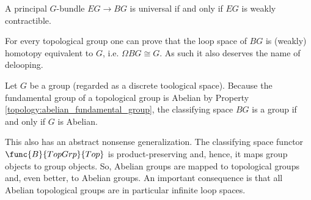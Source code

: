     \begin{property}
        A principal $G$-bundle $EG\rightarrow BG$ is universal if and only if $EG$ is weakly contractible.
    \end{property}
    \begin{property}[Delooping]\label{bundle:delooping}
        For every topological group one can prove that the loop space of $BG$ is (weakly) homotopy equivalent to $G$, i.e. $\Omega BG\cong G$. As such it also deserves the name of delooping.
    \end{property}
    \begin{property}[Groups]
        Let $G$ be a group (regarded as a discrete toological space). Because the fundamental group of a topological group is Abelian by Property \ref{topology:abelian_fundamental_group}, the classifying space $BG$ is a group if and only if $G$ is Abelian.

        This also has an abstract nonsense generalization. The classifying space functor $\func{B}{TopGrp}{Top}$ is product-preserving and, hence, it maps group objects to group objects. So, Abelian groups are mapped to topological groups and, even better, to Abelian groups. An important consequence is that all Abelian topological groups are in particular infinite loop spaces.
    \end{property}

